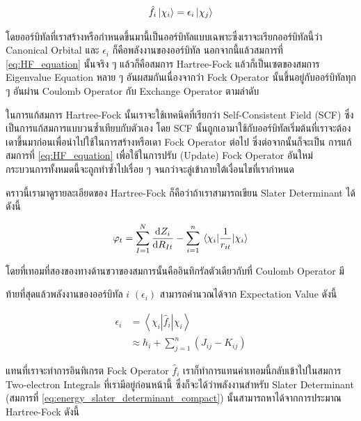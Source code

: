 \begin{equation}
    \label{eq:HF_equation}
    \hat{f}_i \ket{\chi_i}
    =
    \epsilon_{i} \ket{\chi_j}
\end{equation}

\noindent โดยออร์บิทัลที่เราสร้างหรือกำหนดขึ้นมานี้เป็นออร์บิทัลแบบเฉพาะซึ่งเราจะเรียกออร์บิทัลนี้ว่า Canonical Orbital และ $\epsilon_{i}$
ก็คือพลังงานของออร์บิทัล นอกจากนี้แล้วสมการที่ \ref{eq:HF_equation} นั้นจริง ๆ แล้วก็คือสมการ Hartree-Fock แล้วก็เป็นเซตของสมการ%
Eigenvalue Equation หลาย ๆ อันผสมกันเนื่องจากว่า Fock Operator นั้นขึ้นอยู่กับออร์บิทัลทุก ๆ อันผ่าน Coulomb Operator กับ
Exchange Operator ตามลำดับ

ในการแก้สมการ Hartree-Fock นั้นเราจะใช้เทคนิคที่เรียกว่า Self-Consistent Field (SCF) ซึ่งเป็นการแก้สมการแบบวนซ้ำเทียบกับตัวเอง
โดย SCF นั้นถูกเอามาใช้กับออร์บิทัลเริ่มต้นที่เราจะต้องเดาขึ้นมาก่อนเพื่อนำไปใช้ในการสร้างหรือเดา Fock Operator ต่อไป ซึ่งต่อจากนั้นก็จะเป็น%
การแก้สมการที่ \ref{eq:HF_equation} เพื่อใช้ในการปรับ (Update) Fock Operator อันใหม่ กระบวนการทั้งหมดนี้จะถูกทำซ้ำไปเรื่อย ๆ
จนกว่าจะลู่เข้าภายใต้เงื่อนไขที่เรากำหนด

คราวนี้เรามาดูรายละเอียดของ Hartree-Fock ก็คือว่าถ้าเราสามารถเขียน Slater Determinant ได้ดังนี้

\begin{equation}
    \varphi_{t}
    =
    \sum_{I=1}^{N} \dv{Z_{i}}{R_{It}}
    - \sum_{i=1}^{n} \mel{\chi_{i}}{\frac{1}{r_{it}}}{\chi_{i}}
\end{equation}

\noindent โดยที่เทอมที่สองของทางด้านขวาของสมการนั้นคืออินทิกรัลตัวเดียวกับที่ Coulomb Operator มี

ท้ายที่สุดแล้วพลังงานของออร์บิทัล $i$ $(\epsilon_{i})$ สามารถคำนวณได้จาก Expectation Value ดังนี้

\begin{equation}
    \begin{aligned}
        \epsilon_i
         & = \left\langle\chi_i\left|\hat{f}_i\right| \chi_i\right\rangle \\
         & \approx h_i+\sum_{j=1}^n\left(J_{i j}-K_{i j}\right)
    \end{aligned}
\end{equation}

\noindent แทนที่เราจะทำการอินทิเกรต Fock Operator $\hat{f}_i$ เราก็ทำการแทนค่าเทอมนี้กลับเข้าไปในสมการ Two-electron Integrals
ที่เรามีอยู่ก่อนหน้านี้ ซึ่งก็จะได้ว่าพลังงานสำหรับ Slater Determinant (สมการที่ \ref{eq:energy_slater_determinant_compact})
นั้นสามารถหาได้จากการประมาณ Hartree-Fock ดังนี้

